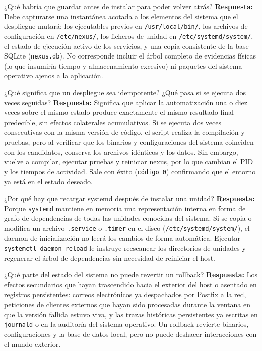 \documentclass[10pt,a4paper]{article}
\begin{document}
\begin{pregunta}{¿Qué habría que guardar antes de instalar para poder volver atrás?}
    \textbf{Respuesta:} Debe capturarse una instantánea acotada a los elementos del sistema que el despliegue mutará: los ejecutables previos en \texttt{/usr/local/bin/}, los archivos de configuración en \texttt{/etc/nexus/}, los ficheros de unidad en \texttt{/etc/systemd/system/}, el estado de ejecución activo de los servicios, y una copia consistente de la base SQLite (\texttt{nexus.db}). No corresponde incluir el árbol completo de evidencias físicas (lo que insumiría tiempo y almacenamiento excesivo) ni paquetes del sistema operativo ajenos a la aplicación.
\end{pregunta}

\begin{pregunta}{¿Qué significa que un despliegue sea idempotente? ¿Qué pasa si se ejecuta dos veces seguidas?}
    \textbf{Respuesta:} Significa que aplicar la automatización una o diez veces sobre el mismo estado produce exactamente el mismo resultado final predecible, sin efectos colaterales acumulativos. Si se ejecuta dos veces consecutivas con la misma versión de código, el script realiza la compilación y pruebas, pero al verificar que los binarios y configuraciones del sistema coinciden con los candidatos, conserva los archivos idénticos y los datos. Sin embargo, vuelve a compilar, ejecutar pruebas y reiniciar nexus, por lo que cambian el PID y los tiempos de actividad. Sale con éxito (\texttt{código 0}) confirmando que el entorno ya está en el estado deseado.
\end{pregunta}

\begin{pregunta}{¿Por qué hay que recargar systemd después de instalar una unidad?}
    \textbf{Respuesta:} Porque \texttt{systemd} mantiene en memoria una representación interna en forma de grafo de dependencias de todas las unidades conocidas del sistema. Si se copia o modifica un archivo \texttt{.service} o \texttt{.timer} en el disco (\texttt{/etc/systemd/system/}), el daemon de inicialización no leerá los cambios de forma automática. Ejecutar \texttt{systemctl daemon-reload} le instruye reescanear los directorios de unidades y regenerar el árbol de dependencias sin necesidad de reiniciar el host.
\end{pregunta}

\begin{pregunta}{¿Qué parte del estado del sistema no puede revertir un rollback?}
    \textbf{Respuesta:} Los efectos secundarios que hayan trascendido hacia el exterior del host o asentado en registros persistentes: correos electrónicos ya despachados por Postfix a la red, peticiones de clientes externos que hayan sido procesadas durante la ventana en que la versión fallida estuvo viva, y las trazas históricas persistentes ya escritas en \texttt{journald} o en la auditoría del sistema operativo. Un rollback revierte binarios, configuraciones y la base de datos local, pero no puede deshacer interacciones con el mundo exterior.
\end{pregunta}
\end{document}

